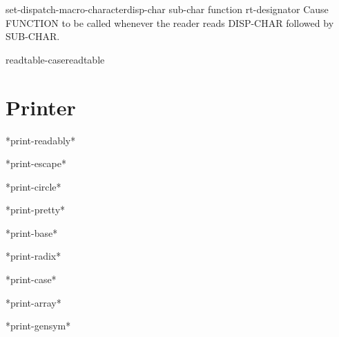 \documentclass[10pt,english]{book}
\begin{document}
\begin{function}{set-dispatch-macro-character}{disp-char sub-char function \op rt-designator}
  Cause FUNCTION to be called whenever the reader reads DISP-CHAR
   followed by SUB-CHAR.
\end{function}

\begin{accessor}{readtable-case}{readtable}
  
\end{accessor}

\section{Printer}
\label{sec:printer}

\begin{variable}{*print-readably*}{}
  
\end{variable}

\begin{variable}{*print-escape*}{}
  
\end{variable}

\begin{variable}{*print-circle*}{}
  
\end{variable}

\begin{variable}{*print-pretty*}{}
  
\end{variable}

\begin{variable}{*print-base*}{}
  
\end{variable}

\begin{variable}{*print-radix*}{}
  
\end{variable}

\begin{variable}{*print-case*}{}
  
\end{variable}

\begin{variable}{*print-array*}{}
  
\end{variable}

\begin{variable}{*print-gensym*}{}
  
\end{variable}
\end{document}
